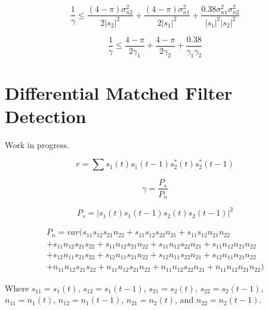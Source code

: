 \documentclass[11pt]{article}
\begin{document}
\begin{equation}
\frac{1}{\gamma}
\leq
\frac{\left( 4-\pi \right) \sigma_{n2}^2}
{2|s_2|^2}
+
\frac{\left( 4-\pi \right) \sigma_{n1}^2}
{2|s_1|^2}
+
\frac{0.38\sigma_{n1}^2 \sigma_{n2}^2}
{|s_1|^2|s_2|^2}
\end{equation}


\begin{equation}
\boxed{
\frac{1}{\gamma}
\leq
\frac{4-\pi}
{2 \gamma_1}
+
\frac{4-\pi}
{2 \gamma_2}
+
\frac{0.38}
{\gamma_1 \gamma_2}
}
\end{equation}


\section{Differential Matched Filter Detection}

Work in progress.

\begin{equation}
r = \sum s_1(t)s_1(t-1) s_2^*(t) s_2^*(t-1)
\end{equation}


\begin{equation}
\gamma
=
\frac{P_s}{P_n}
\end{equation}

\begin{equation}
P_s = |s_1(t)s_1(t-1)s_2(t)s_2(t-1)|^2
\end{equation}

\begin{align}
P_n = var(s_{11}s_{12}s_{21}n_{22} + s_{11}s_{12}s_{22}n_{21} + s_{11}s_{12}n_{21}n_{22}\\
  + s_{11}n_{12}s_{21}s_{22} + s_{11}n_{12}s_{21}n_{22} + s_{11}n_{12}s_{22}n_{21} + s_{11}n_{12}n_{21}n_{22}\\
  + s_{12}n_{11}s_{21}s_{22} + s_{12}n_{11}s_{21}n_{22} + s_{12}n_{11}s_{22}n_{21} + s_{12}n_{11}n_{21}n_{22}\\
  + n_{11}n_{12}s_{21}s_{22} + n_{11}n_{12}s_{21}n_{22} + n_{11}n_{12}s_{22}n_{21} + n_{11}n_{12}n_{21}n_{22})
\end{align}

Where $s_{11} = s_1(t)$, $s_{12} = s_1(t-1)$, $s_{21} = s_2(t)$, $s_{22} = s_2(t-1)$, $n_{11} = n_1(t)$, $n_{12} = n_1(t-1)$, $n_{21} = n_2(t)$, and $n_{22} = n_2(t-1)$.


\end{document}
